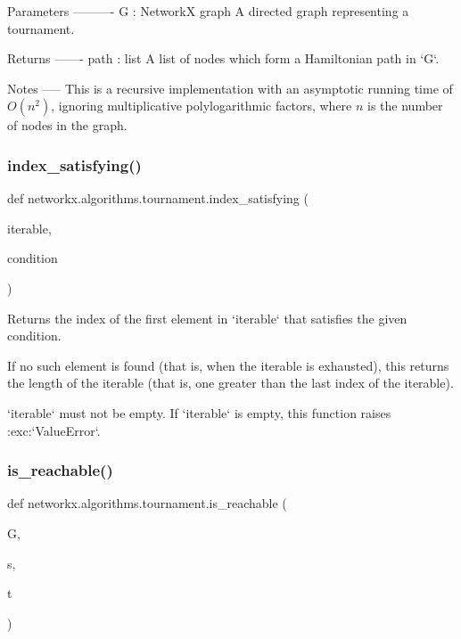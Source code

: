 \begin{DoxyVerb}
\begin{DoxyVerb}
Parameters
----------
G : NetworkX graph
    A directed graph representing a tournament.

Returns
-------
path : list
    A list of nodes which form a Hamiltonian path in `G`.

Notes
-----
This is a recursive implementation with an asymptotic running time
of $O(n^2)$, ignoring multiplicative polylogarithmic factors, where
$n$ is the number of nodes in the graph.\end{DoxyVerb}
 \mbox{\label{namespacenetworkx_1_1algorithms_1_1tournament_ab9bfdfdd0a78f649c7aa5df464eca01c}} 
\subsubsection{\texorpdfstring{index\+\_\+satisfying()}{index\_satisfying()}}
{\footnotesize\ttfamily def networkx.\+algorithms.\+tournament.\+index\+\_\+satisfying (\begin{DoxyParamCaption}\item[{}]{iterable,  }\item[{}]{condition }\end{DoxyParamCaption})}

\begin{DoxyVerb}Returns the index of the first element in `iterable` that
satisfies the given condition.

If no such element is found (that is, when the iterable is
exhausted), this returns the length of the iterable (that is, one
greater than the last index of the iterable).

`iterable` must not be empty. If `iterable` is empty, this
function raises :exc:`ValueError`.\end{DoxyVerb}
 \mbox{\label{namespacenetworkx_1_1algorithms_1_1tournament_a28a915c326ebe1518ca9117308c2f2ce}} 
\subsubsection{\texorpdfstring{is\+\_\+reachable()}{is\_reachable()}}
{\footnotesize\ttfamily def networkx.\+algorithms.\+tournament.\+is\+\_\+reachable (\begin{DoxyParamCaption}\item[{}]{G,  }\item[{}]{s,  }\item[{}]{t }\end{DoxyParamCaption})}


\end{DoxyVerb}

